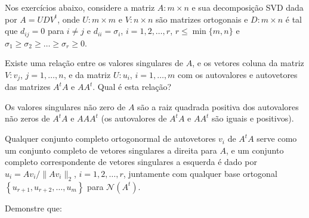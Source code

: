 \documentclass[a4paper,12pt, leqno, answers]{exam}
\begin{document}
\thispagestyle{empty}

\newpage
\setcounter{page}{1}
Nos exerc\'{i}cios abaixo, considere a matriz $A : m \times n$ e sua decomposi\c{c}\~{a}o SVD dada por $A = U D V^t$, onde $U : m \times m$ e $V : n \times n$ s\~{a}o matrizes ortogonais e $D : m \times n$ \'{e} tal que $d_{ij} = 0$ para $i \neq j$ e $d_{ii} = \sigma_i$, $i = 1, 2, \ldots, r$, $r \leq \min\{m, n\}$ e $ \sigma_1 \geq \sigma_2 \geq \ldots \geq \sigma_r \geq 0$.
\begin{questions}
     Existe uma rela\c{c}\~{a}o entre os valores singulares de $A$, e os vetores coluna da matriz $V : v_j$, $j = 1, \ldots, n$, e da matriz $U : u_i$, $i = 1, \ldots, m$ com os autovalores e autovetores das matrizes $A^t A$ e $A A^t$. Qual \'{e} esta rela\c{c}\~{a}o?
    \begin{solution}
        Os valores singulares n\~{a}o zero de $A$ s\~{a}o a raiz quadrada positiva dos autovalores n\~{a}o zeros de $A^t A$ e $A A A^t$ (os autovalores de $A^t A$ e $A A^t$ s\~{a}o iguais e positivos).

        Qualquer conjunto completo ortogonormal de autovetores $v_i$ de $A^t A$ serve como um conjunto completo de vetores singulares a direita para $A$, e um conjunto completo correspondente de vetores singulares a esquerda \'{e} dado por $u_i = A v_i / \| A v_i \|_2$, $i = 1, 2, \ldots, r$, juntamente com qualquer base ortogonal $\left\{ u_{r + 1}, u_{r + 2}, \ldots, u_{m} \right\}$ para $\mathcal{N}(A^t)$.
    \end{solution}

    \question Demonstre que:
\end{questions}
\end{document}
